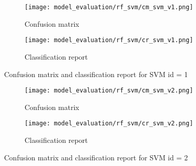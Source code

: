 \begin{figure}[H]
    \centering
    \begin{subfigure}[b]{0.5\textwidth}
        \texttt{[image: model\_evaluation/rf\_svm/cm\_svm\_v1.png]}
        \caption{Confusion matrix}
    \end{subfigure}
    \hfill
    \begin{subfigure}[b]{0.4\textwidth}
        \texttt{[image: model\_evaluation/rf\_svm/cr\_svm\_v1.png]}
        \caption{Classification report}
    \end{subfigure}
    \caption{Confusion matrix and classification report for SVM id = 1}
\end{figure}


\begin{figure}[H]
    \centering
    \begin{subfigure}[b]{0.5\textwidth}
        \texttt{[image: model\_evaluation/rf\_svm/cm\_svm\_v2.png]}
        \caption{Confusion matrix}
    \end{subfigure}
    \hfill
    \begin{subfigure}[b]{0.4\textwidth}
        \texttt{[image: model\_evaluation/rf\_svm/cr\_svm\_v2.png]}
        \caption{Classification report}
    \end{subfigure}
    \caption{Confusion matrix and classification report for SVM id = 2}
\end{figure}







